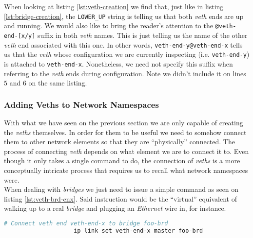             When looking at listing \ref{lst:veth-creation} we find that, just like in listing \ref{lst:bridge-creation}, the \texttt{LOWER\_UP} string is telling us that both \textit{veth} ends are up and running. We would also like to bring the reader's attention to the \texttt{@veth-end-[x/y]} suffix in both \textit{veth} names. This is just telling us the name of the other \textit{veth} end associated with this one. In other words, \texttt{veth-end-y@veth-end-x} tells us that the \textit{veth} whose configuration we are currently inspecting (i.e. \texttt{veth-end-y}) is attached to \texttt{veth-end-x}. Nonetheless, we need not specify this suffix when referring to the \textit{veth} ends during configuration. Note we didn't include it on lines $5$ and $6$ on the same listing.\\

            \subsubsection{Adding Veths to Network Namespaces}
                With what we have seen on the previous section we are only capable of creating the \textit{veths} themselves. In order for them to be useful we need to somehow connect them to other network elements so that they are ``physically'' connected. The process of connecting \textit{veth} depends on what element we are to connect it to. Even though it only takes a single command to do, the connection of \textit{veths} is a more conceptually intricate process that requires us to recall what network namespaces were.\\

                When dealing with \textit{bridges} we just need to issue a simple command as seen on listing \ref{lst:veth-brd-cnx}. Said instruction would be the ``virtual'' equivalent of walking up to a real \textit{bridge} and plugging an \textit{Ethernet} wire in, for instance.\\

                \begin{lstlisting}[language = bash, caption = Connecting a Veth End to a Virtual Bridge., label = lst:veth-brd-cnx]
                    # Connect veth end veth-end-x to bridge foo-brd
                    ip link set veth-end-x master foo-brd
                \end{lstlisting}

